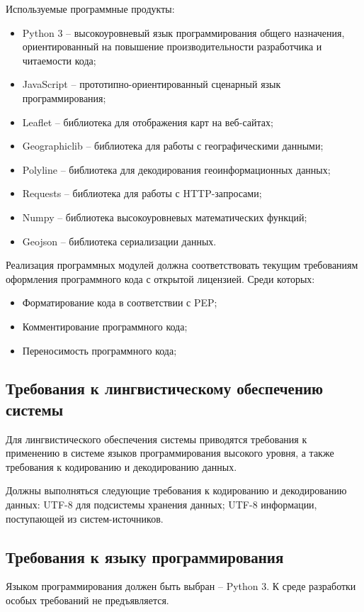 Используемые программные продукты:
\begin{itemize}
    \item Python 3 -- высокоуровневый язык программирования общего назначения, ориентированный на повышение 
        производительности разработчика и читаемости кода;
    \item JavaScript -- прототипно-ориентированный сценарный язык программирования;
    \item Leaflet -- библиотека для отображения карт на веб-сайтах;
    \item Geographiclib -- библиотека для работы с географическими данными;
    \item Polyline -- библиотека для декодирования геоинформационных данных;
    \item Requests -- библиотека для работы с HTTP-запросами;
    \item Numpy -- библиотека высокоуровневых математических функций;
    \item Geojson -- библиотека сериализации данных.
\end{itemize}

Реализация программных модулей должна соответствовать текущим требованиям оформления программного кода 
с открытой лицензией. Среди которых:
\begin{itemize}
    \item Форматирование кода в соответствии с PEP;
    \item Комментирование программного кода;
    \item Переносимость программного кода;
\end{itemize}

\subsection{Требования к лингвистическому обеспечению системы}
Для лингвистического обеспечения системы приводятся требования к применению в системе языков программирования 
высокого уровня, а также требования к кодированию и декодированию данных.

Должны выполняться следующие требования к кодированию и декодированию данных: UTF-8 для подсистемы хранения 
данных; UTF-8 информации, поступающей из систем-источников.

\subsection{Требования к языку программирования}
Языком программирования должен быть выбран -- Python 3. К среде разработки особых требований не предъявляется.

